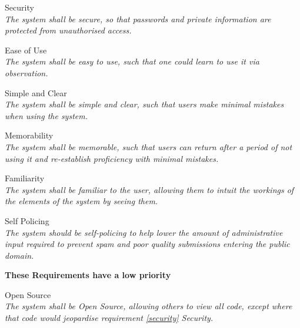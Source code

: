 \begin{requirements}

    \item Security \label{security} \\
	\textit{The system shall be secure, so that passwords and private information are protected from unauthorised access.}

    \item Ease of Use \label{easeofuse} \\
	\textit{The system shall be easy to use, such that one could learn to use it via observation.}

    \item Simple and Clear \label{simpleandclear} \\
	\textit{The system shall be simple and clear, such that users make minimal mistakes when using the system.}

    \item Memorability \label{memorability} \\
	\textit{The system shall be memorable, such that users can return after a period of not using it and re-establish proficiency with minimal mistakes.}

    \item Familiarity \label{familiarity} \\
	\textit{The system shall be familiar to the user, allowing them to intuit the workings of the elements of the system by seeing them.}

    \item Self Policing \label{selfpolicing} \\
	\textit{The system should be self-policing to help lower the amount of administrative input required to prevent spam and poor quality submissions entering the public domain.}

\end{requirements}

\textbf{These Requirements have a low priority}

\begin{requirements}[resume]

    \item Open Source \label{opensource} \\
	\textit{The system shall be Open Source, allowing others to view all code, except where that code would jeopardise requirement \ref{security} Security.}

\end{requirements}


